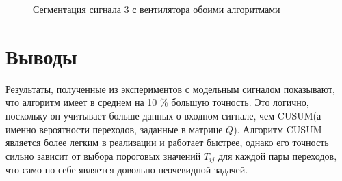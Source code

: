 \documentclass[12pt,a4paper]{article}
\begin{document}
\begin{figure}[h!]
\begin{minipage}[h]{0.49\linewidth}
\end{minipage}
\begin{minipage}[h]{0.49\linewidth}
\end{minipage}
\caption{Сегментация сигнала 3 с вентилятора обоими алгоритмами}
\label{cropped_3}
\end{figure}

\section{Выводы}
Результаты, полученные из экспериментов с модельным сигналом показывают, что алгоритм\cite{burobin} имеет в среднем на 10 \% большую точность. Это логично, поскольку он учитывает больше данных о входном сигнале, чем CUSUM(а именно вероятности переходов, заданные в матрице $Q$). Алгоритм CUSUM является более легким в реализации и работает быстрее, однако его точность сильно зависит от выбора пороговых значений $T_{ij}$ для каждой пары переходов, что само по себе является довольно неочевидной задачей.
\end{document}
